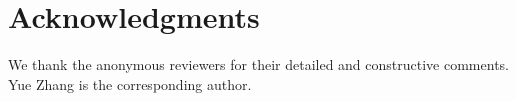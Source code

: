 \documentclass[11pt,letterpaper]{article}
\begin{document}
\begin{comment}
\begin{table}[!tp]
\begin{center}
\renewcommand{\arraystretch}{0.8}
\begin{tabular}{>{\small}l|>{\small}c<{\hspace{-6pt}}>{\small}c<{\hspace{-6pt}}>{\small}c}
\hline
& \multicolumn{3}{>{\small}c}{exponentiation $\alpha$ } \\
\hline
\# & 0.6 & 0.8 & 1.0 \\
\hline
100 & 93.4/94.1/97.6 & 93.6/94.2/97.3 & 93.5/94.1/96.9 \\
200 & 93.6/94.3/97.9 & 93.5/94.4/97.8 & 93.7/94.3/97.3 \\
400 & //98.3 & //98.1 & //97.7 \\
800 & // & // & // \\
1000 & // & // & // \\
1600 & // & // & // \\
\hline
\end{tabular}
\end{center}
\caption{\label{rerank} Reranking results of the in-order parser on section 22 of WSJ. (supervised reranking / semi-supervised reranking / oracle).}
\end{table}
\end{comment}

\section*{Acknowledgments}
We thank the anonymous reviewers for their detailed and constructive comments.
Yue Zhang is the corresponding author.



\end{document}
